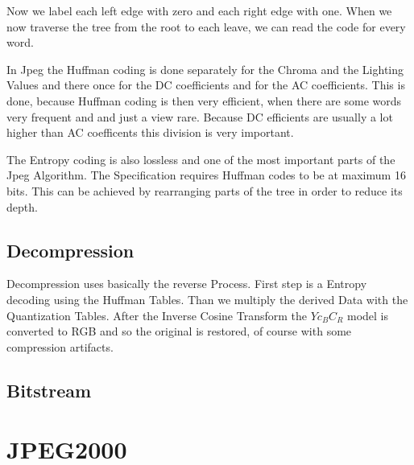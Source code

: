 \documentclass{scrartcl}
\begin{document}
Now we label each left edge with zero and each right edge with one. When we now traverse the tree from the root to each leave, we can read the code for every word.

In Jpeg the Huffman coding is done separately for the Chroma and the Lighting Values and there once for the DC coefficients and for the AC coefficients. This is done, because Huffman coding is then very efficient, when there are some words very frequent and and just a view rare. Because DC efficients are usually a lot higher than AC coefficents this division is very important.

The Entropy coding is also lossless and one of the most important parts of the Jpeg Algorithm. The Specification requires Huffman codes to be at maximum 16 bits. This can be achieved by rearranging parts of the tree in order to reduce its depth.

\subsection{Decompression}
Decompression uses basically the reverse Process. First step is a Entropy decoding using the Huffman Tables. Than we multiply the derived Data with the Quantization Tables. After the Inverse Cosine Transform the $ Yc_BC_R $ model is converted to RGB and so the original is restored, of course with some compression artifacts.

\subsection{Bitstream}


\section{JPEG2000}
\end{document}

